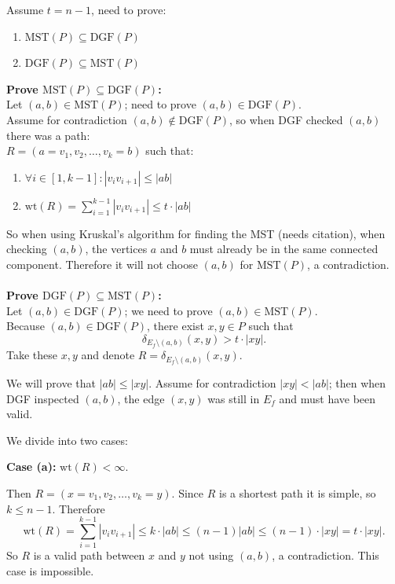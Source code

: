 \documentclass{article}
\begin{document}
Assume $t = n-1$, need to prove:
\begin{enumerate}
    \item $\text{MST}(P) \subseteq \text{DGF}(P)$
    \item $\text{DGF}(P) \subseteq \text{MST}(P)$
\end{enumerate}

\textbf{Prove $\text{MST}(P) \subseteq \text{DGF}(P)$:}\\
Let $(a,b) \in \text{MST}(P)$; need to prove $(a,b) \in \text{DGF}(P)$.\\
Assume for contradiction $(a,b) \notin \text{DGF}(P)$, so when DGF checked $(a,b)$ there was a path:\\
$R = (a = v_1, v_2, \ldots, v_k = b)$ such that:

\begin{enumerate}
    \item[(a)] $\forall i \in [1, k-1] : |v_i v_{i+1}| \leq |ab|$
    \item[(b)] $\mathrm{wt}(R) = \sum_{i=1}^{k-1} |v_i v_{i+1}| \leq t \cdot |ab|$
\end{enumerate}
So when using Kruskal's algorithm for finding the MST (needs citation), when checking $(a,b)$, the vertices $a$ and $b$ must already be in the same connected component.
Therefore it will not choose $(a,b)$ for $\text{MST}(P)$, a contradiction.
\\\\

\textbf{Prove $\text{DGF}(P) \subseteq \text{MST}(P)$:}\\
Let $(a,b) \in \text{DGF}(P)$; we need to prove $(a,b) \in \text{MST}(P)$.\\
Because $(a,b) \in \text{DGF}(P)$, there exist $x, y \in P$ such that
\[
    \delta_{E_f \setminus (a,b)}(x,y) > t \cdot |xy|.
\]
Take these $x, y$ and denote $R = \delta_{E_f \setminus (a,b)}(x,y)$.

We will prove that $|ab| \leq |xy|$.
Assume for contradiction $|xy| < |ab|$; then when DGF inspected $(a,b)$, the edge $(x,y)$ was still in $E_f$ and must have been valid.

We divide into two cases:

\textbf{Case (a):} $\mathrm{wt}(R) < \infty$.

Then $R = (x = v_1, v_2, \ldots, v_k = y)$. Since $R$ is a shortest path it is simple, so $k \leq n-1$. Therefore
\[
    \mathrm{wt}(R) = \sum_{i=1}^{k-1} |v_i v_{i+1}| \leq k \cdot |ab| \leq (n-1)|ab| \leq (n-1) \cdot |xy| = t \cdot |xy|.
\]
So $R$ is a valid path between $x$ and $y$ not using $(a,b)$, a contradiction. This case is impossible.
\end{document}
